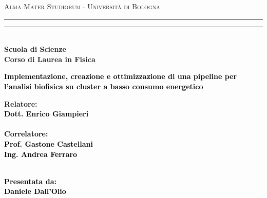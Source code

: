 \documentclass[12pt,a4paper]{report}
\begin{document}
\begin{titlepage}

%
%
%
\begin{center}
{{\Large{\textsc{Alma Mater Studiorum $\cdot$ Universit\`a di Bologna}}}}
\rule[0.1cm]{15.8cm}{0.1mm}
\rule[0.5cm]{15.8cm}{0.6mm}
\\\vspace{3mm}
%
%
{\small{\bf Scuola di Scienze \\ Corso di Laurea in Fisica}}

\end{center}

\vspace{23mm}

\begin{center}\textcolor{black}{
%
%
%
{\LARGE{\bf Implementazione, creazione e ottimizzazione di una pipeline per l'analisi biofisica su cluster a basso consumo energetico}}\\
}\end{center}

\vspace{50mm} \par \noindent

\begin{minipage}[t]{0.47\textwidth}
  {\large
    {\bf Relatore: \vspace{2mm}\\
      \textcolor{black}{
      Dott. Enrico Giampieri}\\\\

	\textcolor{black}{
	\bf Correlatore:
	\vspace{2mm}\\
	Prof. Gastone Castellani \\
	Ing. Andrea Ferraro \\\\
	}
    }
  }
\end{minipage}
%
\hfill
%
\begin{minipage}[t]{0.47\textwidth}\raggedleft \textcolor{black}{
{\large{\bf Presentata da:
\vspace{2mm}\\
Daniele Dall'Olio}}}
\end{minipage}


\end{titlepage}
\end{document}
